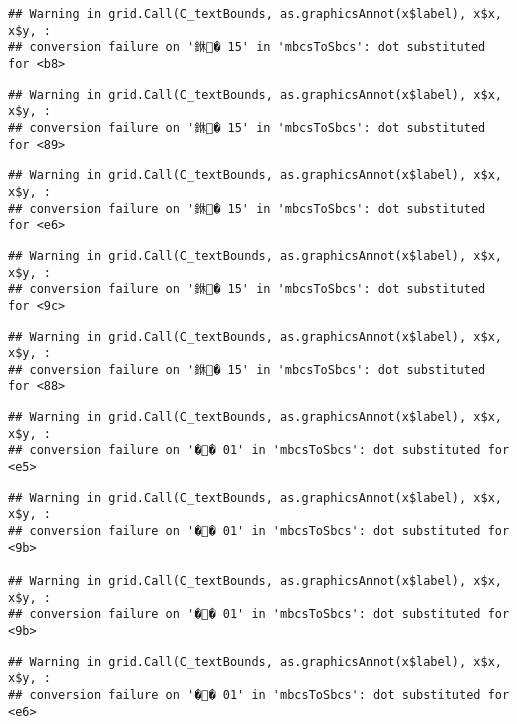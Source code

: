 \documentclass[]{article}
\begin{document}
\begin{verbatim}
## Warning in grid.Call(C_textBounds, as.graphicsAnnot(x$label), x$x, x$y, :
## conversion failure on '銝� 15' in 'mbcsToSbcs': dot substituted for <b8>
\end{verbatim}

\begin{verbatim}
## Warning in grid.Call(C_textBounds, as.graphicsAnnot(x$label), x$x, x$y, :
## conversion failure on '銝� 15' in 'mbcsToSbcs': dot substituted for <89>
\end{verbatim}

\begin{verbatim}
## Warning in grid.Call(C_textBounds, as.graphicsAnnot(x$label), x$x, x$y, :
## conversion failure on '銝� 15' in 'mbcsToSbcs': dot substituted for <e6>
\end{verbatim}

\begin{verbatim}
## Warning in grid.Call(C_textBounds, as.graphicsAnnot(x$label), x$x, x$y, :
## conversion failure on '銝� 15' in 'mbcsToSbcs': dot substituted for <9c>
\end{verbatim}

\begin{verbatim}
## Warning in grid.Call(C_textBounds, as.graphicsAnnot(x$label), x$x, x$y, :
## conversion failure on '銝� 15' in 'mbcsToSbcs': dot substituted for <88>
\end{verbatim}

\begin{verbatim}
## Warning in grid.Call(C_textBounds, as.graphicsAnnot(x$label), x$x, x$y, :
## conversion failure on '�� 01' in 'mbcsToSbcs': dot substituted for <e5>
\end{verbatim}

\begin{verbatim}
## Warning in grid.Call(C_textBounds, as.graphicsAnnot(x$label), x$x, x$y, :
## conversion failure on '�� 01' in 'mbcsToSbcs': dot substituted for <9b>

## Warning in grid.Call(C_textBounds, as.graphicsAnnot(x$label), x$x, x$y, :
## conversion failure on '�� 01' in 'mbcsToSbcs': dot substituted for <9b>
\end{verbatim}

\begin{verbatim}
## Warning in grid.Call(C_textBounds, as.graphicsAnnot(x$label), x$x, x$y, :
## conversion failure on '�� 01' in 'mbcsToSbcs': dot substituted for <e6>
\end{verbatim}
\end{document}
